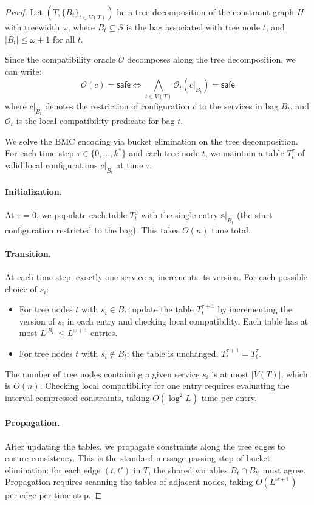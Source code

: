 \documentclass[10pt,twocolumn]{article}
\begin{document}
\begin{proof}
Let $(T, \{B_t\}_{t \in V(T)})$ be a tree decomposition of the
constraint graph $H$ with treewidth $\omega$, where $B_t
\subseteq S$ is the bag associated with tree node $t$, and
$|B_t| \leq \omega + 1$ for all $t$.

Since the compatibility oracle $\mathcal{O}$ decomposes along
the tree decomposition, we can write:
\[
  \mathcal{O}(c) = \mathsf{safe} \iff \bigwedge_{t \in V(T)}
  \mathcal{O}_t(c|_{B_t}) = \mathsf{safe}
\]
where $c|_{B_t}$ denotes the restriction of configuration $c$
to the services in bag $B_t$, and $\mathcal{O}_t$ is the local
compatibility predicate for bag $t$.

We solve the BMC encoding via bucket elimination on the tree
decomposition. For each time step $\tau \in \{0, \ldots, k^{*}\}$
and each tree node $t$, we maintain a table $T_t^\tau$ of
valid local configurations $c|_{B_t}$ at time $\tau$.

\paragraph{Initialization.} At $\tau = 0$, we populate each
table $T_t^0$ with the single entry $\mathbf{s}|_{B_t}$ (the
start configuration restricted to the bag). This takes
$O(n)$ time total.

\paragraph{Transition.} At each time step, exactly one service
$s_i$ increments its version. For each possible choice of $s_i$:
\begin{itemize}[leftmargin=*,nosep]
  \item For tree nodes $t$ with $s_i \in B_t$: update the
    table $T_t^{\tau+1}$ by incrementing the version of $s_i$
    in each entry and checking local compatibility. Each table
    has at most $L^{|B_t|} \leq L^{\omega+1}$ entries.
  \item For tree nodes $t$ with $s_i \notin B_t$: the table
    is unchanged, $T_t^{\tau+1} = T_t^\tau$.
\end{itemize}
The number of tree nodes containing a given service $s_i$ is at
most $|V(T)|$, which is $O(n)$. Checking local compatibility
for one entry requires evaluating the interval-compressed
constraints, taking $O(\log^2 L)$ time per entry.

\paragraph{Propagation.} After updating the tables, we propagate
constraints along the tree edges to ensure consistency. This is
the standard message-passing step of bucket elimination: for each
edge $(t, t')$ in $T$, the shared variables $B_t \cap B_{t'}$
must agree. Propagation requires scanning the tables of adjacent
nodes, taking $O(L^{\omega+1})$ per edge per time step.


\end{proof}
\end{document}
